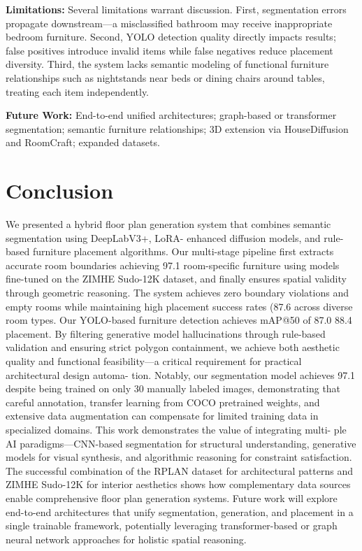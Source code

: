 \documentclass[10pt,conference]{IEEEtran}
\begin{document}
\textbf{Limitations:} Several limitations warrant discussion. First, segmentation errors propagate downstream---a misclassified bathroom may receive inappropriate bedroom furniture. Second, YOLO detection quality directly impacts results; false positives introduce invalid items while false negatives reduce placement diversity. Third, the system lacks semantic modeling of functional furniture relationships such as nightstands near beds or dining chairs around tables, treating each item independently.

\textbf{Future Work:} End-to-end unified architectures; graph-based or transformer segmentation; semantic furniture relationships; 3D extension via HouseDiffusion and RoomCraft; expanded datasets.

\section{Conclusion}

We presented a hybrid floor plan generation system that
combines semantic segmentation using DeepLabV3+, LoRA-
enhanced diffusion models, and rule-based furniture placement
algorithms. Our multi-stage pipeline first extracts accurate
room boundaries achieving 97.1%
room-specific furniture using models fine-tuned on the ZIMHE
Sudo-12K dataset, and finally ensures spatial validity through
geometric reasoning.
The system achieves zero boundary violations and empty
rooms while maintaining high placement success rates (87.6%
across diverse room types. Our YOLO-based furniture detection
achieves mAP@50 of 87.0%
88.4%
placement. By filtering generative model hallucinations through
rule-based validation and ensuring strict polygon containment,
we achieve both aesthetic quality and functional feasibility—a
critical requirement for practical architectural design automa-
tion.
Notably, our segmentation model achieves 97.1%
despite being trained on only 30 manually labeled images,
demonstrating that careful annotation, transfer learning from
COCO pretrained weights, and extensive data augmentation can
compensate for limited training data in specialized domains.
This work demonstrates the value of integrating multi-
ple AI paradigms—CNN-based segmentation for structural
understanding, generative models for visual synthesis, and
algorithmic reasoning for constraint satisfaction. The successful
combination of the RPLAN dataset for architectural patterns
and ZIMHE Sudo-12K for interior aesthetics shows how
complementary data sources enable comprehensive floor plan
generation systems.
Future work will explore end-to-end architectures that unify
segmentation, generation, and placement in a single trainable
framework, potentially leveraging transformer-based or graph
neural network approaches for holistic spatial reasoning.
\end{document}
